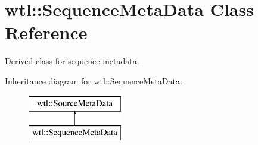 \hypertarget{classwtl_1_1_sequence_meta_data}{}\section{wtl\+:\+:Sequence\+Meta\+Data Class Reference}
\label{classwtl_1_1_sequence_meta_data}


Derived class for sequence metadata.  


Inheritance diagram for wtl\+:\+:Sequence\+Meta\+Data\+:\begin{figure}[H]
\begin{center}
\leavevmode
\includegraphics[height=2.000000cm]{classwtl_1_1_sequence_meta_data}
\end{center}
\end{figure}
